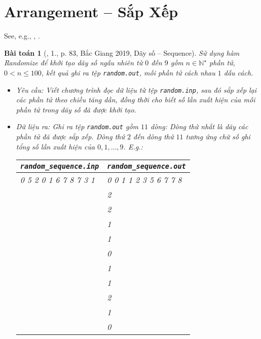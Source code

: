 \documentclass{article}
\newtheorem{baitoan}{Bài toán}
\begin{document}

\section{Arrangement -- Sắp Xếp}
See, e.g., \cite[Chap. 5: Sorting]{Knuth1998}, \cite[Chap. II, Sect. Dạng bài sắp xếp]{VietSTEM2021}.

\begin{baitoan}[\cite{VietSTEM2021}, 1., p. 83, Bắc Giang 2019, Dãy số -- Sequence]
	Sử dụng hàm Randomize để khởi tạo dãy số ngẫu nhiên từ $0$ đến $9$ gồm $n\in\mathbb{N}^\star$ phần tử, $0 < n\le100$, kết quả ghi ra tệp \verb|random.out|, mỗi phần tử cách nhau $1$ dấu cách.
	\begin{itemize}
		\item {\sf Yêu cầu:} Viết chương trình đọc dữ liệu từ tệp \verb|random.inp|, sau đó sắp xếp lại các phần tử theo chiều tăng dần, đồng thời cho biết số lần xuất hiện của mỗi phần tử trong dãy số đã được khởi tạo.
		\item {\sf Dữ liệu ra:} Ghi ra tệp \verb|random.out| gồm $11$ dòng: Dòng thứ nhất là dãy các phần tử đã được sắp xếp. Dòng thứ $2$ đến dòng thứ $11$ tương ứng chữ số ghi tổng số lần xuất hiện của $0,1,\ldots,9$. E.g.:
		\begin{table}[H]
			\centering
			\begin{tabular}{|l|l|}
				\hline
				\verb|random_sequence.inp| & \verb|random_sequence.out| \\
				\hline
				0 5 2 0 1 6 7 8 7 3 1 & 0 0 1 1 2 3 5 6 7 7 8 \\
				& 2 \\
				& 2 \\
				& 1 \\
				& 1 \\
				& 0 \\
				& 1 \\
				& 1 \\
				& 2 \\
				& 1 \\
				& 0 \\
				\hline
			\end{tabular}
		\end{table}
	\end{itemize}
\end{baitoan}
\end{document}
